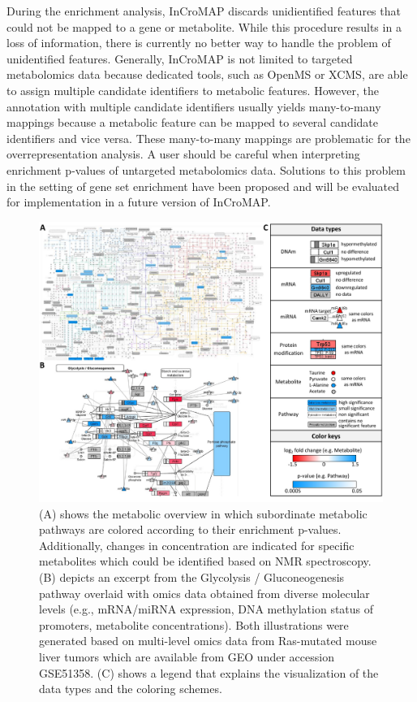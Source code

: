\documentclass[final,5p,times,twocolumn]{elsarticle}
\newcommand\red[1]{{\color{red}#1}}
\begin{document}
During the enrichment analysis, InCroMAP discards unidientified features that could not be mapped to a gene or metabolite. While this procedure results in a loss of information, there is currently no better way to handle the problem of unidentified features. \red{Generally, InCroMAP is not limited to targeted metabolomics data because dedicated tools, such as OpenMS or XCMS, are able to assign multiple candidate identifiers to metabolic features. However, the annotation with multiple candidate identifiers usually yields many-to-many mappings because a metabolic feature can be mapped to several candidate identifiers and vice versa. These many-to-many mappings are problematic for the overrepresentation analysis. A user should be careful when interpreting enrichment p-values of untargeted metabolomics data. Solutions to this problem in the setting of gene set enrichment have been proposed \cite{Kankainen2011} and will be evaluated for implementation in a future version of InCroMAP.}

\begin{figure}
\center
\includegraphics[width=1.0\textwidth]{InCroMAP_examples.pdf}
\caption{\red{(A) shows the metabolic overview in which subordinate metabolic pathways are colored according to their enrichment p-values. Additionally, changes in concentration are indicated for specific metabolites which could be identified based on NMR spectroscopy. (B) depicts an excerpt from the Glycolysis / Gluconeogenesis pathway overlaid with omics data obtained from diverse molecular levels (e.g., mRNA/miRNA expression, DNA methylation status of promoters, metabolite concentrations). Both illustrations were generated based on multi-level omics data from Ras-mutated mouse liver tumors which are available from GEO under accession GSE51358.} (C) shows a legend that explains the visualization of the data types and the coloring schemes.}
\label{fig:incromap-examples}
\end{figure}
\end{document}
